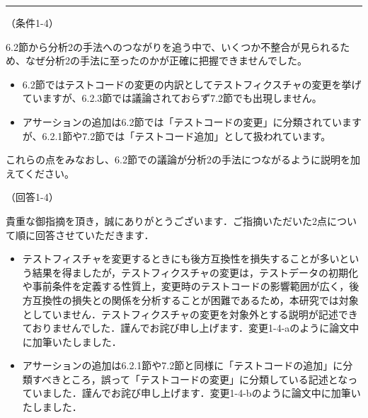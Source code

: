 \documentclass{jarticle} %
\def\subsection#1{ \vspace{1pc} {\gt #1} }
\def\nextans{ \vspace{2pc} \hrule }
\begin{document}
\newpage
\nextans
\subsection{（条件1-4）}

6.2節から分析2の手法へのつながりを追う中で、いくつか不整合が見られるため、なぜ分析2の手法に至ったのかが正確に把握できませんでした。
\begin{itemize}
\item 6.2節ではテストコードの変更の内訳としてテストフィクスチャの変更を挙げていますが、6.2.3節では議論されておらず7.2節でも出現しません。
\item アサーションの追加は6.2節では「テストコードの変更」に分類されていますが、6.2.1節や7.2節では「テストコード追加」として扱われています。
\end{itemize}
これらの点をみなおし、6.2節での議論が分析2の手法につながるように説明を加えてください。

\subsection{（回答1-4）}

貴重な御指摘を頂き，誠にありがとうございます．ご指摘いただいた2点について順に回答させていただきます．
\begin{itemize}
\item テストフィスチャを変更するときにも後方互換性を損失することが多いという結果を得ましたが，テストフィクスチャの変更は，テストデータの初期化や事前条件を定義する性質上，変更時のテストコードの影響範囲が広く，後方互換性の損失との関係を分析することが困難であるため，本研究では対象としていません．テストフィクスチャの変更を対象外とする説明が記述できておりませんでした．謹んでお詫び申し上げます．変更1-4-aのように論文中に加筆いたしました．
\item アサーションの追加は6.2.1節や7.2節と同様に「テストコードの追加」に分類すべきところ，誤って「テストコードの変更」に分類している記述となっていました．謹んでお詫び申し上げます．変更1-4-bのように論文中に加筆いたしました．
\end{itemize}
\end{document}
